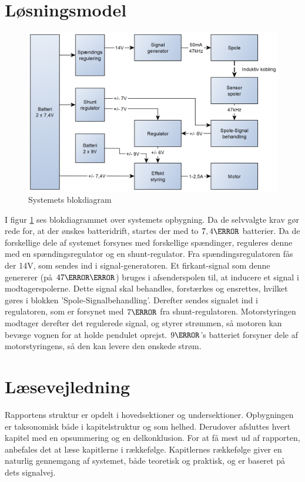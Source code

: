 \clearpage\newpage
\section{Løsningsmodel}
\begin{figure}[h!]
	\centering
	\includegraphics[width=.9\textwidth]{diagram/blokdiagram1.png}
	\caption{Systemets blokdiagram}
	\label{fig:blockdiagram1}
\end{figure}
\FloatBlock
I figur \ref{fig:blockdiagram1} ses blokdiagrammet over systemets opbygning. 
Da de selvvalgte krav gør rede for, at der ønskes batteridrift, startes der med to $7,4\volt$ batterier. 
Da de forskellige dele af systemet forsynes med forskellige spændinger, reguleres denne med en spændingsregulator og en shunt-regulator. Fra spændingsregulatoren fås der 14V, som sendes ind i signal-generatoren. 
Et firkant-signal som denne genererer (på $47\kilo\hertz$) bruges i afsenderspolen til, at inducere et signal i modtagerspolerne. 
Dette signal skal behandles, forstærkes og ensrettes, hvilket gøres i blokken 'Spole-Signalbehandling'.
Derefter sendes signalet ind i regulatoren, som er forsynet med $7\volt$ fra shunt-regulatoren. 
Motorstyringen modtager derefter det regulerede signal, og styrer strømmen, så motoren kan bevæge vognen for at holde pendulet oprejst. 
$9\volt$'s batteriet forsyner dele af motorstyringens, så den kan levere den ønskede strøm. 

\section{Læsevejledning}
Rapportens struktur er opdelt i hovedsektioner og undersektioner.
Opbygningen er taksonomisk både i kapitelstruktur og som helhed. 
Derudover afsluttes hvert kapitel med en opsummering og en delkonklusion.
For at få mest ud af rapporten, anbefales det at læse kapitlerne i rækkefølge.
Kapitlernes rækkefølge giver en naturlig gennemgang af systemet, både teoretisk og praktisk, og er baseret på dets signalvej.

